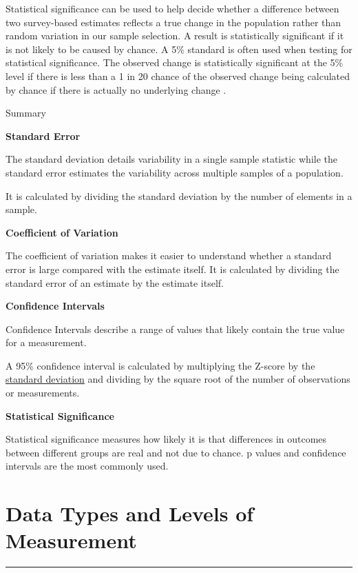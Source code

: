 \documentclass[
]{book}
\begin{document}
Statistical significance can be used to help decide whether a difference between two survey-based estimates reflects a true change in the population rather than random variation in our sample selection. A result is statistically significant if it is not likely to be caused by chance. A 5\% standard is often used when testing for statistical significance. The observed change is statistically significant at the 5\% level if there is less than a 1 in 20 chance of the observed change being calculated by chance if there is actually no underlying change \citep{uncertainty}.

Summary

\textbf{Standard Error}

The standard deviation details variability in a single sample statistic while the standard error estimates the variability across multiple samples of a population.

It is calculated by dividing the standard deviation by the number of elements in a sample.

\textbf{Coefficient of Variation}

The coefficient of variation makes it easier to understand whether a standard error is large compared with the estimate itself. It is calculated by dividing the standard error of an estimate by the estimate itself.

\textbf{Confidence Intervals}

Confidence Intervals describe a range of values that likely contain the true value for a measurement.

A 95\% confidence interval is calculated by multiplying the Z-score by the \protect\hyperlink{stdv}{standard deviation} and dividing by the square root of the number of observations or measurements.

\textbf{Statistical Significance}

Statistical significance measures how likely it is that differences in outcomes between different groups are real and not due to chance. p values and confidence intervals are the most commonly used.

\hypertarget{datatypes}{%
\chapter{Data Types and Levels of Measurement}\label{datatypes}}

\begin{center}\rule{0.5\linewidth}{0.5pt}\end{center}
\end{document}
